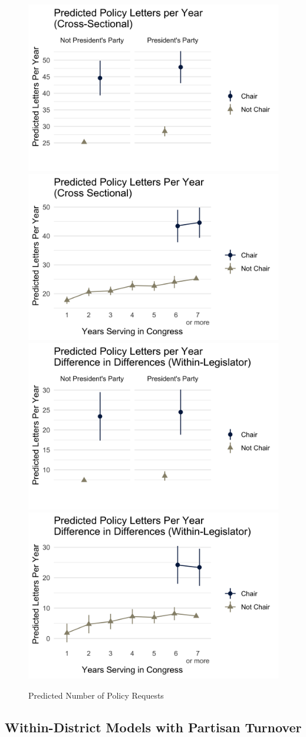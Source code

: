 \begin{figure}[hbt!]
\centering
\caption{Predicted Number of Policy Requests} \label{f:m-policy-predicted}
\includegraphics[width = .48\textwidth]{figs/m-policy-predicted-1} 
\includegraphics[width = .48\textwidth]{figs/m-policy-predicted-2} 
\includegraphics[width = .48\textwidth]{figs/m-policy-predicted-3} 
\includegraphics[width = .48\textwidth]{figs/m-policy-predicted-4} 

\end{figure}

\subsection{Within-District Models with Partisan Turnover} \label{s:appendix_models_district}


